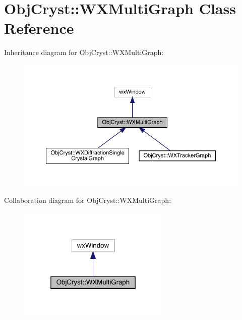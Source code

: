 \hypertarget{class_obj_cryst_1_1_w_x_multi_graph}{}\section{Obj\+Cryst\+::W\+X\+Multi\+Graph Class Reference}
\label{class_obj_cryst_1_1_w_x_multi_graph}


Inheritance diagram for Obj\+Cryst\+::W\+X\+Multi\+Graph\+:
\nopagebreak
\begin{figure}[H]
\begin{center}
\leavevmode
\includegraphics[width=350pt]{class_obj_cryst_1_1_w_x_multi_graph__inherit__graph}
\end{center}
\end{figure}


Collaboration diagram for Obj\+Cryst\+::W\+X\+Multi\+Graph\+:
\nopagebreak
\begin{figure}[H]
\begin{center}
\leavevmode
\includegraphics[width=205pt]{class_obj_cryst_1_1_w_x_multi_graph__coll__graph}
\end{center}
\end{figure}
